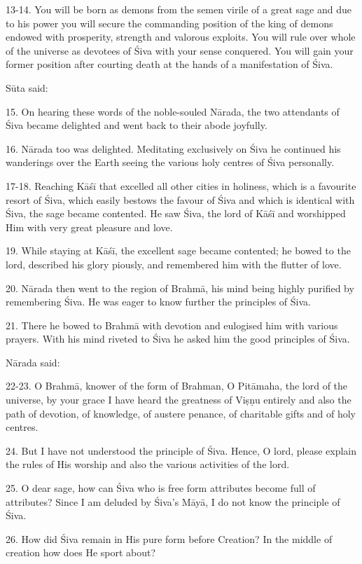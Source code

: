 13-14. You will be born as demons from the semen virile of a great sage and due
to his power you will secure the commanding position of the king of demons
endowed with prosperity, strength and valorous exploits. You will rule over
whole of the universe as devotees of Śiva with your sense conquered. You will
gain your former position after courting death at the hands of a manifestation
of Śiva.

Sūta said:

15. On hearing these words of the noble-souled Nārada, the two attendants of
Śiva became delighted and went back to their abode joyfully.

16. Nārada too was delighted. Meditating exclusively on Śiva he continued his
wanderings over the Earth seeing the various holy centres of Śiva personally.

17-18. Reaching Kāśī that excelled all other cities in holiness, which is
a favourite resort of Śiva, which easily bestows the favour of Śiva and which is
identical with Śiva, the sage became contented. He saw Śiva, the lord of Kāśī
and worshipped Him with very great pleasure and love.

19. While staying at Kāśī, the excellent sage became contented; he bowed to
the lord, described his glory piously, and remembered him with the flutter of
love.

20. Nārada then went to the region of Brahmā, his mind being highly purified by
remembering Śiva. He was eager to know further the principles of Śiva.

21. There he bowed to Brahmā with devotion and eulogised him with various
prayers. With his mind riveted to Śiva he asked him the good principles of Śiva.

Nārada said:

22-23. O Brahmā, knower of the form of Brahman, O Pitāmaha, the lord of
the universe, by your grace I have heard the greatness of Viṣṇu entirely and
also the path of devotion, of knowledge, of austere penance, of charitable gifts
and of holy centres.

24. But I have not understood the principle of Śiva. Hence, O lord, please
explain the rules of His worship and also the various activities of the lord.

25. O dear sage, how can Śiva who is free form attributes become full of
attributes? Since I am deluded by Śiva’s Māyā, I do not know the principle of
Śiva.

26. How did Śiva remain in His pure form before Creation? In the middle of
creation how does He sport about?

